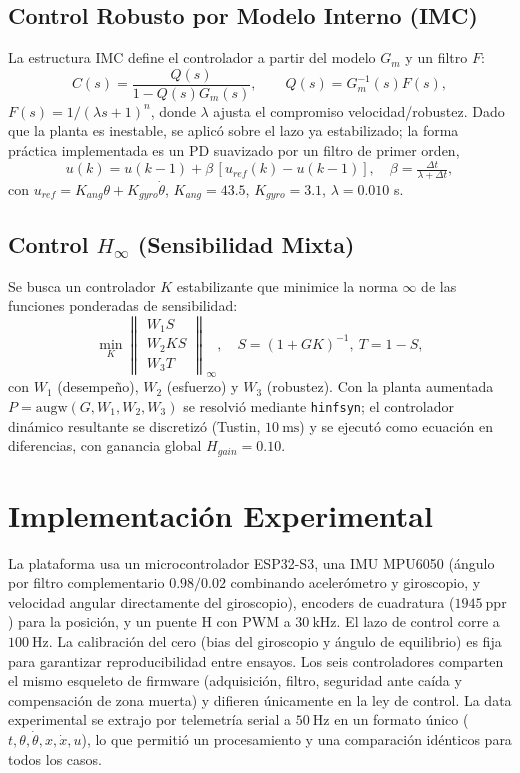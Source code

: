 \documentclass[conference]{IEEEtran}
\begin{document}
\subsection{Control Robusto por Modelo Interno (IMC)}
La estructura IMC define el controlador a partir del modelo $G_m$ y un filtro
$F$:
\begin{equation}
C(s)=\frac{Q(s)}{1-Q(s)G_m(s)},\qquad Q(s)=G_m^{-1}(s)F(s),
\end{equation}
$F(s)=1/(\lambda s+1)^n$, donde $\lambda$ ajusta el compromiso
velocidad/robustez. Dado que la planta es inestable, se aplic\'o sobre el lazo ya
estabilizado; la forma pr\'actica implementada es un PD suavizado por un filtro de
primer orden,
\begin{equation}
u(k)=u(k{-}1)+\beta\,[u_{ref}(k)-u(k{-}1)],\quad \beta=\tfrac{\Delta t}{\lambda+\Delta t},
\end{equation}
con $u_{ref}=K_{ang}\theta+K_{gyro}\dot\theta$, $K_{ang}=43.5$, $K_{gyro}=3.1$,
$\lambda=0.010$ s.

\subsection{Control $H_\infty$ (Sensibilidad Mixta)}
Se busca un controlador $K$ estabilizante que minimice la norma $\infty$ de las
funciones ponderadas de sensibilidad:
\begin{equation}
\min_{K}\left\|\begin{matrix}W_1 S\\ W_2 KS\\ W_3 T\end{matrix}\right\|_\infty,\quad S=(1+GK)^{-1},\ T=1-S,
\end{equation}
con $W_1$ (desempe\~no), $W_2$ (esfuerzo) y $W_3$ (robustez). Con la planta
aumentada $P=\mathrm{augw}(G,W_1,W_2,W_3)$ se resolvi\'o mediante \texttt{hinfsyn};
el controlador din\'amico resultante se discretiz\'o (Tustin, $10~\mathrm{ms}$) y
se ejecut\'o como ecuaci\'on en diferencias, con ganancia global $H_{gain}=0.10$.

\section{Implementaci\'on Experimental}
La plataforma usa un microcontrolador ESP32-S3, una IMU MPU6050 (\'angulo por
filtro complementario $0.98/0.02$ combinando aceler\'ometro y giroscopio, y
velocidad angular directamente del giroscopio), encoders de cuadratura
($1945~\mathrm{ppr}$) para la posici\'on, y un puente H con PWM a
$30~\mathrm{kHz}$. El lazo de control corre a $100~\mathrm{Hz}$. La calibraci\'on
del cero (bias del giroscopio y \'angulo de equilibrio) es fija para garantizar
reproducibilidad entre ensayos. Los seis controladores comparten el mismo
esqueleto de firmware (adquisici\'on, filtro, seguridad ante ca\'ida y
compensaci\'on de zona muerta) y difieren \'unicamente en la ley de control. La
data experimental se extrajo por telemetr\'ia serial a $50~\mathrm{Hz}$ en un
formato \'unico ($t,\theta,\dot\theta,x,\dot x,u$), lo que permiti\'o un
procesamiento y una comparaci\'on id\'enticos para todos los casos.
\end{document}
